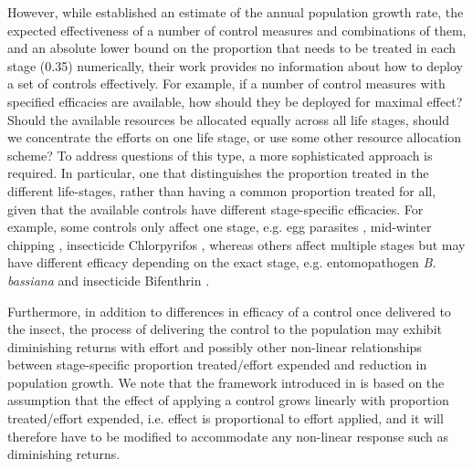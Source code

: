 \documentclass[onecolumn]{article}
\begin{document}
However, while \citep{Strombom2021} established an estimate of the annual population growth rate, the expected effectiveness of a number of control measures and combinations of them, and an absolute lower bound on the proportion that needs to be treated in each stage (0.35) numerically, their work provides no information about how to deploy a set of controls effectively. For example, if a number of control measures with specified efficacies are available, how should they be deployed for maximal effect? Should the available resources be allocated equally across all life stages, should we concentrate the efforts on one life stage, or use some other resource allocation scheme? To address questions of this type, a more sophisticated approach is required. In particular, one that distinguishes the proportion treated in the different life-stages, rather than having a common proportion treated for all, given that the available controls have different stage-specific efficacies. For example, some controls only affect one stage, e.g. egg parasites \citep{Liu2019a}, mid-winter chipping \citep{Cooperband2018}, insecticide Chlorpyrifos \citep{Shin2010,Leach2019}, whereas others affect multiple stages but may have different efficacy depending on the exact stage, e.g. entomopathogen \textit{B. bassiana} \citep{Clifton2020} and insecticide Bifenthrin \citep{Leach2019}.

Furthermore, in addition to differences in efficacy of a control once delivered to the insect, the process of delivering the control to the population may exhibit diminishing returns with effort \citep{Oerke2006,Mitchell2014,Brown2017,Edholm2018} and possibly other non-linear relationships between stage-specific proportion treated/effort expended and reduction in population growth. We note that the framework introduced in \citep{Strombom2021} is based on the assumption that the effect of applying a control grows linearly with proportion treated/effort expended, i.e. effect is proportional to effort applied, and it will therefore have to be modified to accommodate any non-linear response such as diminishing returns.
\end{document}
